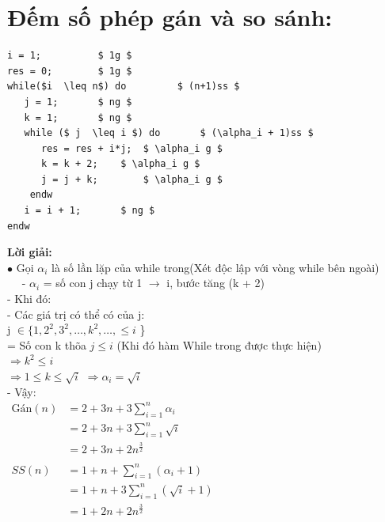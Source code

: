 \documentclass[12pt, letterpaper]{article}
\begin{document}
{{\section{Đếm số phép gán và so sánh:}
\begin{lstlisting}
i = 1;			$ 1g $
res = 0;		$ 1g $
while($i  \leq n$) do	      $ (n+1)ss $    
   j = 1;		$ ng $
   k = 1;		$ ng $
   while ($ j  \leq i $) do	      $ (\alpha_i + 1)ss $
      res = res + i*j;	$ \alpha_i g $
      k = k + 2;	$ \alpha_i g $
      j = j + k;		$ \alpha_i g $		
    endw
   i = i + 1;		$ ng $
endw
	\end{lstlisting}
	\textbf{Lời giải:} \\
	$\bullet$ Gọi $\alpha_i$ là số lần lặp của while trong(Xét độc lập với vòng while bên ngoài)\\
	$\quad${ 
	- $\alpha_i$ = số con j chạy từ 1 $\rightarrow$ i, bước tăng (k + 2) \\
	- Khi đó:\\
	- Các giá trị có thể có của j: \\
    j $\in \{ 1, 2^2, 3^2, \ldots, k^2, \ldots, \leq i$ \}\\
	= Số con k thõa $ j \leq i$ (Khi đó hàm While trong được thực hiện)\\ 
	$\Rightarrow k^2 \leq i$\\
	$\Rightarrow 1 \leq k \leq \sqrt{i}$
	$\Rightarrow \alpha_i = \sqrt{i}$\\
	- Vậy: \\
	$ \begin{aligned}
		\text{Gán}(n) & = 2 + 3n + 3\sum^{n}_{i = 1}\alpha_i\\
			& = 2 + 3n + 3\sum^{n}_{i = 1}\sqrt i\\
			& = 2 + 3n + 2n^\frac{3}{2}\\
			\\SS(n) & = 1 + n + \sum^{n}_{i = 1}(\alpha_i + 1)\\
			& = 1 + n + 3\sum^{n}_{i = 1}(\sqrt i + 1)\\
			& = 1 + 2n + 2n^\frac{3}{2}\\
	\end{aligned} $ \\

}}}
\end{document}
